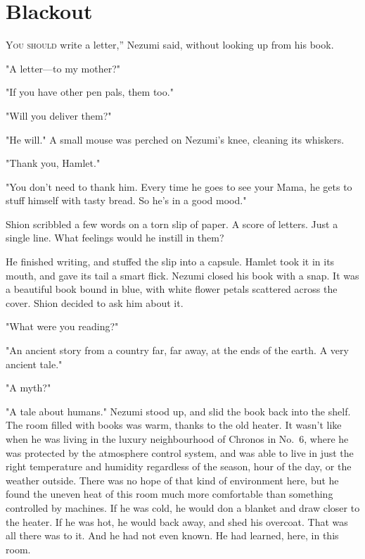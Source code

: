 
\chapter{Blackout}


\lettrine[ante=``]{Y}{ou should} write a letter,'' Nezumi said, without looking up from his
book.

"A letter---to my mother?"

"If you have other pen pals, them too."

"Will you deliver them?"

"He will." A small mouse was perched on Nezumi's knee, cleaning its
whiskers.

"Thank you, Hamlet."

"You don't need to thank him. Every time he goes to see your Mama, he
gets to stuff himself with tasty bread. So he's in a good mood."

Shion scribbled a few words on a torn slip of paper. A score of letters.
Just a single line. What feelings would he instill in them?

He finished writing, and stuffed the slip into a capsule. Hamlet took it
in its mouth, and gave its tail a smart flick. Nezumi closed his book
with a snap. It was a beautiful book bound in blue, with white flower
petals scattered across the cover. Shion decided to ask him about it.

"What were you reading?"

"An ancient story from a country far, far away, at the ends of the
earth. A very ancient tale."

"A myth?"

"A tale about humans." Nezumi stood up, and slid the book back into the
shelf. The room filled with books was warm, thanks to the old heater. It
wasn't like when he was living in the luxury neighbourhood of Chronos in
No.~6, where he was protected by the atmosphere control system, and was
able to live in just the right temperature and humidity regardless of
the season, hour of the day, or the weather outside. There was no hope
of that kind of environment here, but he found the uneven heat of this
room much more comfortable than something controlled by machines. If he
was cold, he would don a blanket and draw closer to the heater. If he
was hot, he would back away, and shed his overcoat. That was all there
was to it. And he had not even known. He had learned, here, in this
room.

